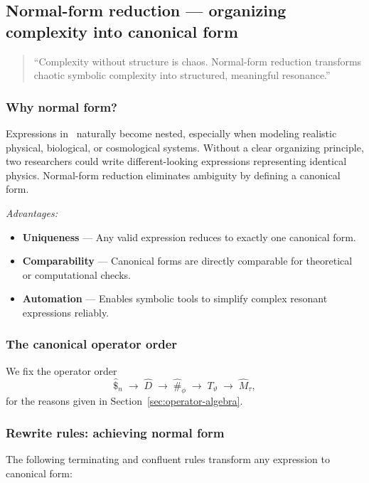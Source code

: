 \subsection{Normal-form reduction — organizing complexity into canonical form}

\begin{quote}
“Complexity without structure is chaos. Normal-form reduction transforms chaotic symbolic complexity into structured, meaningful resonance.”
\end{quote}

\subsubsection{Why normal form?}

Expressions in \RCM\ naturally become nested, especially when modeling realistic physical, biological, or cosmological systems. Without a clear organizing principle, two researchers could write different-looking expressions representing identical physics. Normal-form reduction eliminates ambiguity by defining a canonical form.

\emph{Advantages:}
\begin{itemize}[leftmargin=1.5em]
  \item \textbf{Uniqueness} — Any valid expression reduces to exactly one canonical form.
  \item \textbf{Comparability} — Canonical forms are directly comparable for theoretical or computational checks.
  \item \textbf{Automation} — Enables symbolic tools to simplify complex resonant expressions reliably.
\end{itemize}

\subsubsection{The canonical operator order}

We fix the operator order
\[
  \hat{\$}_n \;\to\; \hat{D} \;\to\; \hat{\#}_{\phi} \;\to\; T_{\vartheta} \;\to\; \hat{M}_{\tau},
\]
for the reasons given in Section~\ref{sec:operator-algebra}.

\subsubsection{Rewrite rules: achieving normal form}

The following terminating and confluent rules transform any expression to canonical form:

